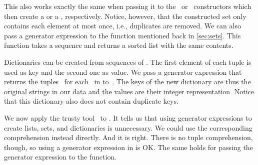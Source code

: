 This also works exactly the same when passing it to the~ or~ constructors which then create a  or a , respectively.
Notice, however, that the constructed set only contains each element at most once, i.e., duplicates are removed.
We can also pass a generator expression to the  function mentioned back in \cref{sec:sets}.
This function takes a sequence and returns a sorted list with the same contents.

Dictionaries can be created from sequences of .
The first element of each tuple is used as key and the second one as value.
We pass a generator expression that returns the tuples~ for each~ in  to~.
The keys of the new dictionary are thus the original strings in our  data and the values are their integer representation.
Notice that this dictionary also does not contain duplicate keys.

We now apply the trusty tool \ruff\ to .
It tells us that using generator expressions to create lists, sets, and dictionaries is unnecessary.
We could use the corresponding comprehension instead directly.
And it is right.
There is no tuple comprehension, though, so using a generator expression in  is OK.
The same holds for passing the generator expression to the  function.

